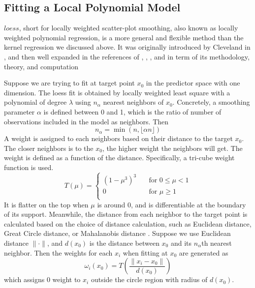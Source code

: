 \subsection{Fitting a Local Polynomial Model}
\label{sec:loess}

$loess$, short for locally weighted scatter-plot smoothing, also known as locally
weighted polynomial regression, is a more general and flexible
method than the kernel regression we discussed above. It was originally introduced 
by Cleveland in \cite{Cleveland:1979}, and then well expanded in the references 
of \cite{cleveland1988locally}, \cite{cleveland1991computational}, 
\cite{cleveland1988regression}, and \cite{cleveland1996smoothing} in term of its
methodology, theory, and computation

Suppose we are trying to fit at target point $x_0$ in the predictor space with
one dimension. The loess fit is obtained by locally weighted least square with a
polynomial of degree $\lambda$ using $n_{\alpha}$ nearest neighbors of $x_0$. 
Concretely, a smoothing parameter $\alpha$ is defined between 0 and 1, which is
the ratio of number of observations included in the model as neighbors. Then 
\begin{equation} 
n_{\alpha} = \min(n, \lfloor \alpha n \rfloor)
\end{equation}
A weight is assigned to each neighbors based on their distance to the target $x_0$.
The closer neighbors is to the $x_0$, the higher weight the neighbors will get. The
weight is defined as a function of the distance. Specifically, a tri-cube weight 
function is used.
\begin{equation} 
\label{tricube}
T(\mu) =
  \begin{cases}
    (1 - \mu^3)^3       & \quad \text{for } 0 \le \mu < 1\\
    0  & \quad \text{for } \mu \ge 1\\
  \end{cases}
\end{equation}
It is flatter on the top when $\mu$ is around 0, and is differentiable at the 
boundary of its support.
Meanwhile, the distance from each neighbor to the target point is calculated 
based on the choice of distance calculation, such as Euclidean distance, Great 
Circle distance, or Mahalanobis distance \cite{mahalanobis1936}. 
Suppose we use Euclidean distance $\|\cdot\|$, and $d(x_0)$ is the distance 
between $x_0$ and its $n_{\alpha}$th nearest neighbor.
Then the weights for each $x_i$ when fitting at $x_0$ are generated as
\begin{equation} 
\omega_i(x_0) = T \left( \frac{\| x_i - x_0 \|}{d(x_0)} \right)
\end{equation}
which assigns 0 weight to $x_i$ outside the circle region with radius of $d(x_0)$.

